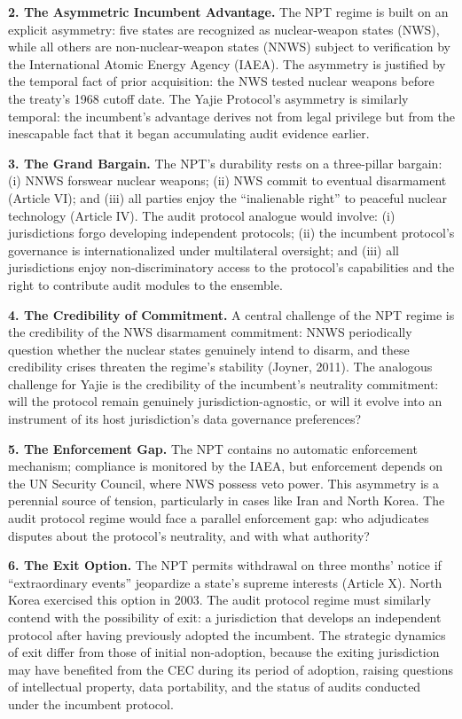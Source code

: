 \documentclass[12pt,a4paper]{ctexart}
\theoremstyle{definition}
\theoremstyle{remark}
\begin{document}
\textbf{2. The Asymmetric Incumbent Advantage.} The NPT regime is built on an explicit asymmetry: five states are recognized as nuclear-weapon states (NWS), while all others are non-nuclear-weapon states (NNWS) subject to verification by the International Atomic Energy Agency (IAEA). The asymmetry is justified by the temporal fact of prior acquisition: the NWS tested nuclear weapons before the treaty's 1968 cutoff date. The Yajie Protocol's asymmetry is similarly temporal: the incumbent's advantage derives not from legal privilege but from the inescapable fact that it began accumulating audit evidence earlier.

\textbf{3. The Grand Bargain.} The NPT's durability rests on a three-pillar bargain: (i) NNWS forswear nuclear weapons; (ii) NWS commit to eventual disarmament (Article VI); and (iii) all parties enjoy the ``inalienable right'' to peaceful nuclear technology (Article IV). The audit protocol analogue would involve: (i) jurisdictions forgo developing independent protocols; (ii) the incumbent protocol's governance is internationalized under multilateral oversight; and (iii) all jurisdictions enjoy non-discriminatory access to the protocol's capabilities and the right to contribute audit modules to the ensemble.

\textbf{4. The Credibility of Commitment.} A central challenge of the NPT regime is the credibility of the NWS disarmament commitment: NNWS periodically question whether the nuclear states genuinely intend to disarm, and these credibility crises threaten the regime's stability (Joyner, 2011). The analogous challenge for Yajie is the credibility of the incumbent's neutrality commitment: will the protocol remain genuinely jurisdiction-agnostic, or will it evolve into an instrument of its host jurisdiction's data governance preferences?

\textbf{5. The Enforcement Gap.} The NPT contains no automatic enforcement mechanism; compliance is monitored by the IAEA, but enforcement depends on the UN Security Council, where NWS possess veto power. This asymmetry is a perennial source of tension, particularly in cases like Iran and North Korea. The audit protocol regime would face a parallel enforcement gap: who adjudicates disputes about the protocol's neutrality, and with what authority?

\textbf{6. The Exit Option.} The NPT permits withdrawal on three months' notice if ``extraordinary events'' jeopardize a state's supreme interests (Article X). North Korea exercised this option in 2003. The audit protocol regime must similarly contend with the possibility of exit: a jurisdiction that develops an independent protocol after having previously adopted the incumbent. The strategic dynamics of exit differ from those of initial non-adoption, because the exiting jurisdiction may have benefited from the CEC during its period of adoption, raising questions of intellectual property, data portability, and the status of audits conducted under the incumbent protocol.
\end{document}
